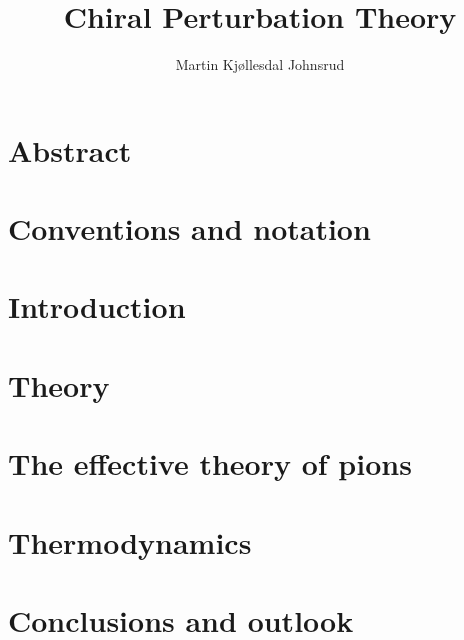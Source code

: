 \documentclass[oneside]{book}
\title{Chiral Perturbation Theory}
\author{Martin Kjøllesdal Johnsrud}
\begin{document}
\maketitle 

\tableofcontents
\listoftodos

\chapter*{Abstract}

\chapter*{Conventions and notation}



\chapter{Introduction}



\chapter{Theory}
\label{chapter:theory}






\chapter{The effective theory of pions}
\label{chapter:effective theory of pions}








\chapter{Thermodynamics}
\label{chapter:thermodynamics}






\chapter{Conclusions and outlook}
\label{chpater:conclusion and outlook}
\end{document}
